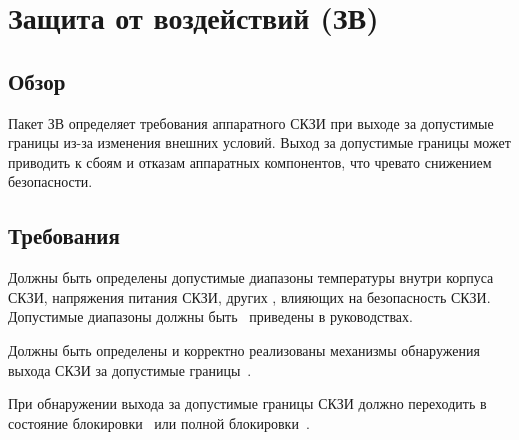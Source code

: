 \section{Защита от воздействий (ЗВ)}\label{EF}

\subsection{Обзор}\label{EF.Intro}

Пакет ЗВ определяет требования  аппаратного СКЗИ при выходе 
 за допустимые 
границы из-за изменения внешних условий.
%
Выход за допустимые границы может приводить к сбоям и отказам аппаратных 
компонентов, что чревато снижением безопасности.

\subsection{Требования}\label{EF.Reqs}

\label{R.EF.Ranges}
Должны быть определены допустимые диапазоны температуры внутри корпуса СКЗИ, 
напряжения питания СКЗИ, других , 
влияющих на безопасность СКЗИ. Допустимые диапазоны 
должны быть~ приведены в руководствах.

\label{R.EF.Detect}
Должны быть определены и корректно реализованы механизмы 
обнаружения выхода  СКЗИ 
за допустимые границы~. 

\label{R.EF.Lock}
При обнаружении выхода за допустимые границы СКЗИ должно переходить
в состояние блокировки~ или полной 
блокировки~. 
